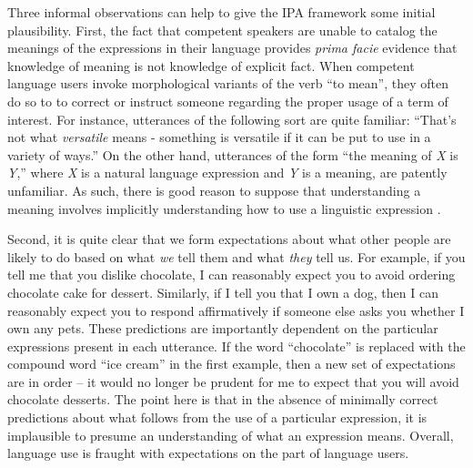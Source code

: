 Three informal observations can help to give the IPA framework some initial plausibility. First, the fact that competent speakers are unable to catalog the meanings of the expressions in their language provides \textit{prima facie} evidence that knowledge of meaning is not knowledge of explicit fact. When competent language users invoke morphological variants of the verb ``to mean'', they often do so to to correct or instruct someone regarding the proper usage of a term of interest. For instance, utterances of the following sort are quite familiar: ``That's not what \textit{versatile} means - something is versatile if it can be put to use in a variety of ways.'' On the other hand, utterances of the form ``the meaning of \textit{X} is \textit{Y},'' where \textit{X} is a natural language expression and \textit{Y} is a meaning, are patently unfamiliar. As such, there is good reason to suppose that understanding a meaning involves implicitly understanding how to use a linguistic expression \citep{Brandom:1994,Horwich:2005}.

Second, it is quite clear that we form expectations about what other people are likely to do based on what \textit{we} tell them and what \textit{they} tell us. For example, if you tell me that you dislike chocolate, I can reasonably expect you to avoid ordering chocolate cake for dessert. Similarly, if I tell you that I own a dog, then I can reasonably expect you to respond affirmatively if someone else asks you whether I own any pets. These predictions are importantly dependent on the particular expressions present in each utterance. If the word ``chocolate'' is replaced with the compound word ``ice cream'' in the first example, then a new set of expectations are in order -- it would no longer be prudent for me to expect that you will avoid chocolate desserts. The point here is that in the absence of minimally correct predictions about what follows from the use of a particular expression, it is implausible to presume an understanding of what an expression means. Overall, language use is fraught with expectations on the part of language users.
 

